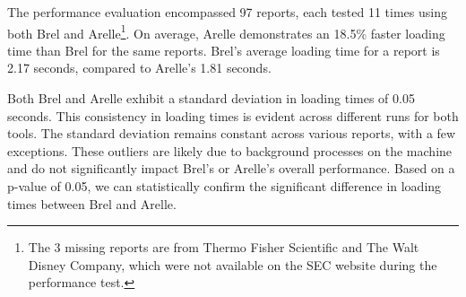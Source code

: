 The performance evaluation encompassed 97 reports, each tested 11 times using both Brel and Arelle\footnote{The 3 missing reports are from Thermo Fisher Scientific and The Walt Disney Company, which were not available on the SEC website during the performance test.}.
On average, Arelle demonstrates an 18.5\% faster loading time than Brel for the same reports.
Brel's average loading time for a report is 2.17 seconds, compared to Arelle's 1.81 seconds.

Both Brel and Arelle exhibit a standard deviation in loading times of 0.05 seconds.
This consistency in loading times is evident across different runs for both tools.
The standard deviation remains constant across various reports, with a few exceptions.
These outliers are likely due to background processes on the machine and do not significantly impact Brel's or Arelle's overall performance.
Based on a p-value of 0.05, we can statistically confirm the significant difference in loading times between Brel and Arelle.




